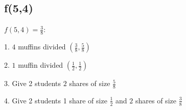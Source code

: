 \documentclass[a4paper]{article}
\begin{document}
\subsection{f(5,4)}
\hspace{4ex}
$f(5,4) = \frac{3}{8}$:

\noindent
\hspace{4ex}
1. $4$ muffins divided $(\frac{3}{8},\frac{5}{8})$

\noindent
\hspace{4ex}
2. $1$ muffin divided $(\frac{1}{2},\frac{1}{2})$

\noindent
\hspace{4ex}
3. Give 2 students $2$ shares of size $\frac{5}{8}$

\noindent
\hspace{4ex}
4. Give 2 students 1 share of size $\frac{1}{2}$ and $2$ shares of size $\frac{3}{8}$
\end{document}
